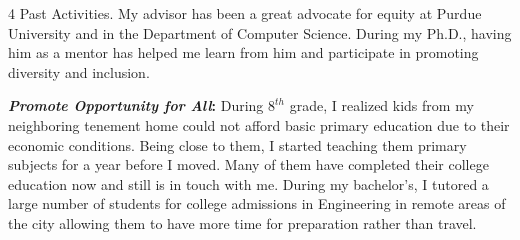 \documentclass[9pt]{article}
\makeatletter
\def \paragraph {%
    \@startsection{paragraph}%
        {4}%
        \z@\z@{-\fontdimen 6 \font}%
        {\large \scshape \bfseries}%
    }
\newcommand*\heading[1]{\textbf{\textit{#1}:}}
\makeatother
\begin{document}
\medskip
\paragraph{Past Activities.} 
My advisor has been a great advocate for equity at Purdue University and in the Department of Computer Science. During my Ph.D., having him as a mentor has helped me learn from him and participate in promoting diversity and inclusion.

%
%
%
\heading{Promote Opportunity for All}
During $8^{th}$ grade, I realized kids from my neighboring tenement home could not afford basic primary education due to their economic conditions. Being close to them, I started teaching them primary subjects for a year before I moved. Many of them have completed their college education now and still is in touch with me.
%
%
During my bachelor's, I tutored a large number of students for college admissions in Engineering in remote areas of the city allowing them to have more time for preparation rather than travel.
% 
\end{document}
